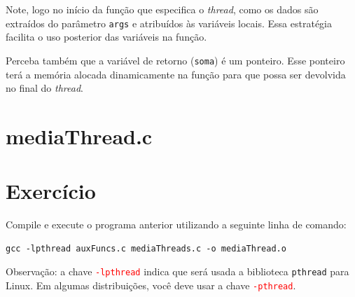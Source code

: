 Note, logo no início da função que especifica o \textit{thread}, como os dados são extraídos do parâmetro \texttt{args} e atribuídos às variáveis locais. Essa estratégia facilita o uso posterior das variáveis na função.

Perceba também que a variável de retorno (\texttt{soma}) é um ponteiro. Esse ponteiro terá a memória alocada dinamicamente na função para que possa ser devolvida no final do \textit{thread}. 

\newpage

\section*{mediaThread.c}


\section{Exercício}
Compile e execute o programa anterior utilizando a seguinte linha de comando:

\begin{lstlisting}[style=MyBashStyle]
gcc -lpthread auxFuncs.c mediaThreads.c -o mediaThread.o
\end{lstlisting}

\textcolor{orange}{\faWarning} Observação: a chave \textcolor{red}{\texttt{-lpthread}} indica que será usada a biblioteca \texttt{pthread} para Linux. Em algumas distribuições, você deve usar a chave \textcolor{red}{\texttt{-pthread}}.
